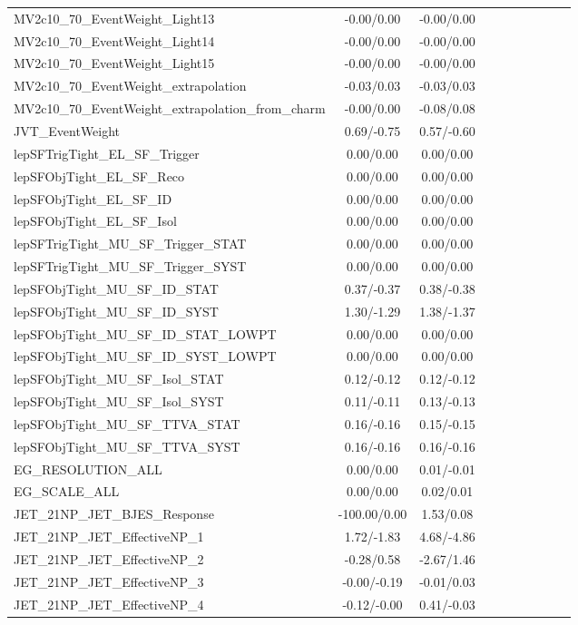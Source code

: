 \begin{table}[h]
\begin{center}
\begin{tabular}{l|ccccccccc}
MV2c10\_70\_EventWeight\_Light13 &-0.00/0.00 &-0.00/0.00 \\
MV2c10\_70\_EventWeight\_Light14 &-0.00/0.00 &-0.00/0.00 \\
MV2c10\_70\_EventWeight\_Light15 &-0.00/0.00 &-0.00/0.00 \\
MV2c10\_70\_EventWeight\_extrapolation &-0.03/0.03 &-0.03/0.03 \\
MV2c10\_70\_EventWeight\_extrapolation\_from\_charm &-0.00/0.00 &-0.08/0.08 \\
JVT\_EventWeight &0.69/-0.75 &0.57/-0.60 \\
lepSFTrigTight\_EL\_SF\_Trigger &0.00/0.00 &0.00/0.00 \\
lepSFObjTight\_EL\_SF\_Reco &0.00/0.00 &0.00/0.00 \\
lepSFObjTight\_EL\_SF\_ID &0.00/0.00 &0.00/0.00 \\
lepSFObjTight\_EL\_SF\_Isol &0.00/0.00 &0.00/0.00 \\
lepSFTrigTight\_MU\_SF\_Trigger\_STAT &0.00/0.00 &0.00/0.00 \\
lepSFTrigTight\_MU\_SF\_Trigger\_SYST &0.00/0.00 &0.00/0.00 \\
lepSFObjTight\_MU\_SF\_ID\_STAT &0.37/-0.37 &0.38/-0.38 \\
lepSFObjTight\_MU\_SF\_ID\_SYST &1.30/-1.29 &1.38/-1.37 \\
lepSFObjTight\_MU\_SF\_ID\_STAT\_LOWPT &0.00/0.00 &0.00/0.00 \\
lepSFObjTight\_MU\_SF\_ID\_SYST\_LOWPT &0.00/0.00 &0.00/0.00 \\
lepSFObjTight\_MU\_SF\_Isol\_STAT &0.12/-0.12 &0.12/-0.12 \\
lepSFObjTight\_MU\_SF\_Isol\_SYST &0.11/-0.11 &0.13/-0.13 \\
lepSFObjTight\_MU\_SF\_TTVA\_STAT &0.16/-0.16 &0.15/-0.15 \\
lepSFObjTight\_MU\_SF\_TTVA\_SYST &0.16/-0.16 &0.16/-0.16 \\
EG\_RESOLUTION\_ALL &0.00/0.00 &0.01/-0.01 \\
EG\_SCALE\_ALL &0.00/0.00 &0.02/0.01 \\
JET\_21NP\_JET\_BJES\_Response &-100.00/0.00 &1.53/0.08 \\
JET\_21NP\_JET\_EffectiveNP\_1 &1.72/-1.83 &4.68/-4.86 \\
JET\_21NP\_JET\_EffectiveNP\_2 &-0.28/0.58 &-2.67/1.46 \\
JET\_21NP\_JET\_EffectiveNP\_3 &-0.00/-0.19 &-0.01/0.03 \\
JET\_21NP\_JET\_EffectiveNP\_4 &-0.12/-0.00 &0.41/-0.03 \\

\end{tabular}
\end{center}
\end{table}
